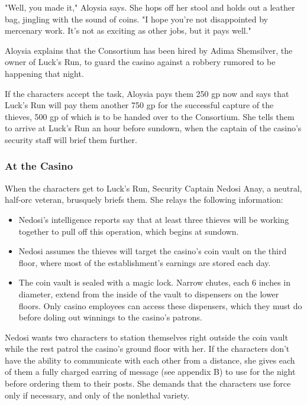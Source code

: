 \documentclass[10pt,a4paper,twoside,bg=print,twocolumn,openany,nodeprecatedcode]{dndbook}
\begin{document}
\begin{DndReadAloud}{}
"Well, you made it," Aloysia says. She hops off her stool and holds out a leather bag, jingling with the sound of coins. "I hope you're not disappointed by mercenary work. It's not as exciting as other jobs, but it pays well."

\end{DndReadAloud}

Aloysia explains that the Consortium has been hired by Adima Shemsilver, the owner of Luck's Run, to guard the casino against a robbery rumored to be happening that night.

If the characters accept the task, Aloysia pays them 250 gp now and says that Luck's Run will pay them another 750 gp for the successful capture of the thieves, 500 gp of which is to be handed over to the Consortium. She tells them to arrive at Luck's Run an hour before sundown, when the captain of the casino's security staff will brief them further.

\subsubsection{At the Casino}
When the characters get to Luck's Run, Security Captain Nedosi Anay, a neutral, half-orc veteran, brusquely briefs them. She relays the following information:


\begin{itemize}
\item Nedosi's intelligence reports say that at least three thieves will be working together to pull off this operation, which begins at sundown.
\item Nedosi assumes the thieves will target the casino's coin vault on the third floor, where most of the establishment's earnings are stored each day.
\item The coin vault is sealed with a magic lock. Narrow chutes, each 6 inches in diameter, extend from the inside of the vault to dispensers on the lower floors. Only casino employees can access these dispensers, which they must do before doling out winnings to the casino's patrons.
\end{itemize}

Nedosi wants two characters to station themselves right outside the coin vault while the rest patrol the casino's ground floor with her. If the characters don't have the ability to communicate with each other from a distance, she gives each of them a fully charged earring of message (see appendix B) to use for the night before ordering them to their posts. She demands that the characters use force only if necessary, and only of the nonlethal variety.
\end{document}
